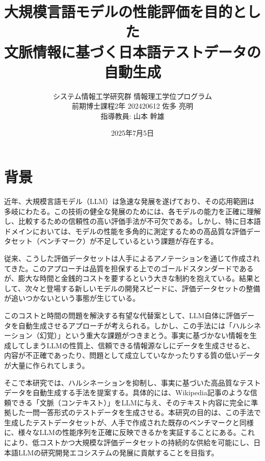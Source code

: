 \documentclass[twocolumn]{jsarticle}
\begin{document}
\title{\vspace{-3cm}大規模言語モデルの性能評価を目的とした\\
文脈情報に基づく日本語テストデータの自動生成}
\author{
  システム情報工学研究群 情報理工学位プログラム\\
  前期博士課程2年 202420612 佐多 亮明\\
  指導教員: 山本 幹雄
}
\date{2025年7月5日}
\maketitle



\section{背景}
近年、大規模言語モデル（LLM）は急速な発展を遂げており、その応用範囲は多岐にわたる。この技術の健全な発展のためには、各モデルの能力を正確に理解し、比較するための信頼性の高い評価手法が不可欠である。しかし、特に日本語ドメインにおいては、モデルの性能を多角的に測定するための高品質な評価データセット（ベンチマーク）が不足しているという課題が存在する。

従来、こうした評価データセットは人手によるアノテーションを通じて作成されてきた。このアプローチは品質を担保する上でのゴールドスタンダードであるが、膨大な時間と金銭的コストを要するという大きな制約を抱えている。結果として、次々と登場する新しいモデルの開発スピードに、評価データセットの整備が追いつかないという事態が生じている。

このコストと時間の問題を解決する有望な代替案として、LLM自体に評価データを自動生成させるアプローチが考えられる。しかし、この手法には「ハルシネーション（幻覚）」という重大な課題がつきまとう。事実に基づかない情報を生成してしまうLLMの性質上、信頼できる情報源なしにデータを生成させると、内容が不正確であったり、問題として成立していなかったりする質の低いデータが大量に作られてしまう。

そこで本研究では、ハルシネーションを抑制し、事実に基づいた高品質なテストデータを自動生成する手法を提案する。具体的には、Wikipedia記事のような信頼できる「文脈（コンテキスト）」をLLMに与え、そのテキスト内容に完全に準拠した一問一答形式のテストデータを生成させる。本研究の目的は、この手法で生成したテストデータセットが、人手で作成された既存のベンチマークと同様に、様々なLLMの性能序列を正確に反映できるかを実証することにある。これにより、低コストかつ大規模な評価データセットの持続的な供給を可能にし、日本語LLMの研究開発エコシステムの発展に貢献することを目指す。
\end{document}
